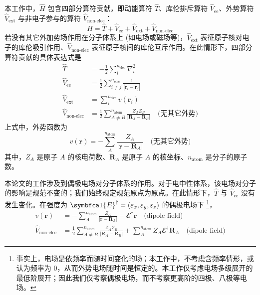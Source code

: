 本工作中，$\hat H$ 包含四部分算符贡献，即动能算符 $\hat T$、库伦排斥算符 $\hat V_\mathrm{ee}$、外势算符 $\hat V_\mathrm{ext}$ 与非电子参与的算符 $\hat V_\text{non-elec}$：
\begin{equation}
  \label{eq.1.def.hamiltonian}
  \hat H = \hat T + \hat V_\mathrm{ee} + \hat V_\mathrm{ext} + \hat V_\text{non-elec}
\end{equation}
若没有其它外加势场作用在分子体系上 (如电场或磁场等)，$\hat V_\mathrm{ext}$ 表征原子核对电子的库伦吸引作用、$\hat V_\text{non-elec}$ 表征原子核间的库伦互斥作用。在此情形下，四部分算符贡献的具体表达式是
\begin{align}
  \hat T &= - \frac{1}{2} \sum_i^{n_\mathrm{elec}} \nabla_i^2 \\
  \hat V_\mathrm{ee} &= \frac{1}{2} \sum_{i \neq j}^{n_\mathrm{elec}} \frac{1}{| \bm{r}_i - \bm{r}_j |} \\
  \hat V_\mathrm{ext} &= \sum_{i}^{n_\mathrm{elec}} v (\bm{r}_i) \\
  \hat V_\text{non-elec} &= \frac{1}{2} \sum_{A \neq B}^{n_\mathrm{atom}} \frac{Z_A Z_B}{| \bm{R}_A  - \bm{R}_B |} \quad \text{(无其它外势)}
\end{align}
上式中，外势函数为
\begin{equation}
  v (\bm{r}) = - \sum_{A}^{n_\mathrm{atom}} \frac{Z_A}{| \bm{r} - \bm{R}_A |} \quad \text{(无其它外势)}
\end{equation}
其中，$Z_A$ 是原子 $A$ 的核电荷数、$\bm{R}_A$ 是原子 $A$ 的核坐标、$n_\mathrm{atom}$ 是分子的原子数。

本论文的工作涉及到偶极电场对分子体系的作用。对于电中性体系，该电场对分子的影响是规范不变的；我们始终规定规范原点为原点。在此情形下，$\hat T$ 与 $\hat V_\mathrm{ee}$ 没有发生变化。在强度为 $\symbfcal{E}^\dagger = (\varepsilon_x, \varepsilon_y, \varepsilon_z)$ 的偶极电场下 \cite{Atkins-Friedman.Oxford.2011}\footnote{事实上，电场是依频率而随时间变化的场；本工作中，不考虑含频率情形，或认为频率为 0，从而外势电场随时间是恒定的。本工作仅考虑电场多级展开的最低阶展开；因此我们仅考察偶极电场，而不考察更高阶的四极、八极等电场。}，
\begin{align}
  \label{eq.1.dipole-v-r}
  v (\bm{r}) &= - \sum_{A}^{n_\mathrm{atom}} \frac{Z_A}{| \bm{r} - \bm{R}_A |} - \mathbfcal{E}^\dagger \bm{r} \quad \text{(dipole field)} \\
  \label{eq.1.dipole-nonelec-r}
  \hat V_\text{non-elec} &= \frac{1}{2} \sum_{A \neq B}^{n_\mathrm{atom}} \frac{Z_A Z_B}{| \bm{R}_A  - \bm{R}_B |} + \sum_{A}^{n_\mathrm{atom}} Z_A \mathbfcal{E}^\dagger \bm{R}_A \quad \text{(dipole field)}
\end{align}

